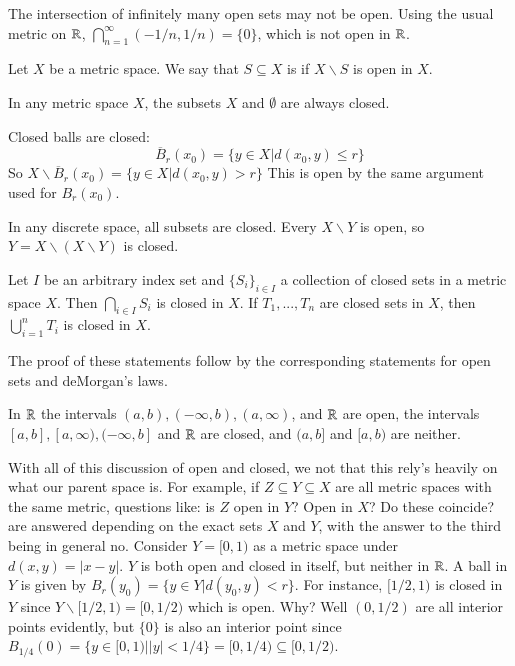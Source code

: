 \begin{example}
    The intersection of infinitely many open sets may not be open. Using the usual metric on $\mathbb R$, $\bigcap_{n=1}^{\infty}(-1/n,1/n) = \{0\}$, which is not open in $\mathbb R$.
\end{example}

\begin{definition}
    Let $X$ be a metric space. We say that $S \subseteq X$ is  if $X\backslash S$ is open in $X$.
\end{definition}

\begin{example}
    In any metric space $X$, the subsets $X$ and $\emptyset$ are always closed.
\end{example}

\begin{example}
    Closed balls are closed: \begin{equation*}
        \overline{B}_r(x_0) = \{y \in X\vert d(x_0,y) \leq r\}
    \end{equation*}
    So $X \backslash \overline{B}_r(x_0) = \{y \in X\vert d(x_0,y) > r\}$ This is open by the same argument used for $B_r(x_0)$.
\end{example}

\begin{example}
    In any discrete space, all subsets are closed. Every $X \backslash Y$ is open, so $Y = X\backslash(X\backslash Y)$ is closed.
\end{example}


\begin{proposition}
    Let $I$ be an arbitrary index set and $\{S_i\}_{i \in I}$ a collection of closed sets in a metric space $X$. Then $\bigcap_{i \in I}S_i$ is closed in $X$. If $T_1,...,T_n$ are closed sets in $X$, then $\bigcup_{i=1}^nT_i$ is closed in $X$.
\end{proposition}
The proof of these statements follow by the corresponding statements for open sets and deMorgan's laws.

\begin{example}
    In $\mathbb R$ the intervals $(a,b), (-\infty,b),(a,\infty)$, and $\mathbb R$ are open, the intervals $[a,b],[a,\infty),(-\infty,b]$ and $\mathbb R$ are closed, and $(a,b]$ and $[a,b)$ are neither.
\end{example}

With all of this discussion of open and closed, we not that this rely's heavily on what our parent space is. For example, if $Z \subseteq Y \subseteq X$ are all metric spaces with the same metric, questions like: is $Z$ open in $Y$? Open in $X$? Do these coincide? are answered depending on the exact sets $X$ and $Y$, with the answer to the third being in general no. Consider $Y = [0,1)$ as a metric space under $d(x,y) = |x-y|$. $Y$ is both open and closed in itself, but neither in $\mathbb R$. A ball in $Y$ is given by $B_r(y_0) = \{y \in Y\vert d(y_0,y) < r\}$. For instance, $[1/2,1)$ is closed in $Y$ since $Y\backslash[1/2,1) = [0,1/2)$ which is open. Why? Well $(0,1/2)$ are all interior points evidently, but $\{0\}$ is also an interior point since $B_{1/4}(0) = \{y \in [0,1)\vert |y| < 1/4\} = [0,1/4) \subseteq [0,1/2)$.

